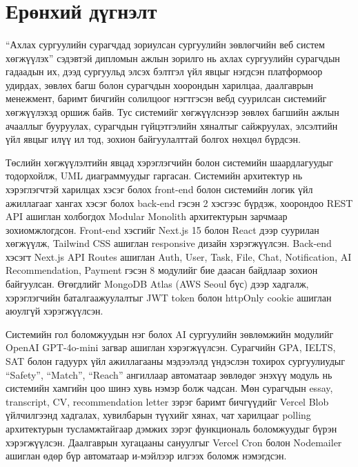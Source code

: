 
{}
\label{Summary}
\section*{Ерөнхий дүгнэлт}

\begin{sloppypar}
\paragraph{}
``Ахлах сургуулийн сурагчдад зориулсан сургуулийн зөвлөгчийн веб систем хөгжүүлэх'' сэдэвтэй дипломын ажлын зорилго нь ахлах сургуулийн сурагчдын гадаадын их, дээд сургуульд элсэх бэлтгэл үйл явцыг нэгдсэн платформоор удирдах, зөвлөх багш болон сурагчдын хоорондын харилцаа, даалгаврын менежмент, баримт бичгийн солилцоог нэгтгэсэн вебд суурилсан системийг хөгжүүлэхэд оршиж байв. Тус системийг хөгжүүлснээр зөвлөх багшийн ажлын ачааллыг бууруулах, сурагчдын гүйцэтгэлийн хяналтыг сайжруулах, элсэлтийн үйл явцыг илүү ил тод, зохион байгуулалттай болгох нөхцөл бүрдсэн.

\par Төслийн хөгжүүлэлтийн явцад хэрэглэгчийн болон системийн шаардлагуудыг тодорхойлж, UML диаграммуудыг гаргасан. Системийн архитектур нь хэрэглэгчтэй харилцах хэсэг болох front-end болон системийн логик үйл ажиллагааг хангах хэсэг болох back-end гэсэн 2 хэсгээс бүрдэж, хоорондоо REST API ашиглан холбогдох Modular Monolith архитектурын зарчмаар зохиомжлогдсон. Front-end хэсгийг Next.js 15 болон React дээр суурилан хөгжүүлж, Tailwind CSS ашиглан responsive дизайн хэрэгжүүлсэн. Back-end хэсэгт Next.js API Routes ашиглан Auth, User, Task, File, Chat, Notification, AI Recommendation, Payment гэсэн 8 модулийг бие даасан байдлаар зохион байгуулсан. 
Өгөгдлийг MongoDB Atlas (AWS Seoul бүс) дээр хадгалж, хэрэглэгчийн баталгаажуулалтыг JWT token болон httpOnly cookie ашиглан аюулгүй хэрэгжүүлсэн.

\par Системийн гол боломжуудын нэг болох AI сургуулийн зөвлөмжийн модулийг OpenAI GPT-4o-mini загвар ашиглан хэрэгжүүлсэн. Сурагчийн GPA, IELTS, SAT болон гадуурх үйл ажиллагааны мэдээлэлд үндэслэн тохирох сургуулиудыг ``Safety'', ``Match'', ``Reach'' ангиллаар автоматаар зөвлөдөг энэхүү модуль нь системийн хамгийн цоо шинэ хувь нэмэр болж чадсан. Мөн сурагчдын essay, transcript, CV, recommendation letter зэрэг баримт бичгүүдийг Vercel Blob үйлчилгээнд хадгалах, хувилбарын түүхийг хянах, чат харилцааг polling архитектурын тусламжтайгаар дэмжих зэрэг функциональ боломжуудыг бүрэн хэрэгжүүлсэн. Даалгаврын хугацааны сануулгыг Vercel Cron болон Nodemailer ашиглан өдөр бүр автоматаар и-мэйлээр илгээх боломж нэмэгдсэн.


\end{sloppypar}
